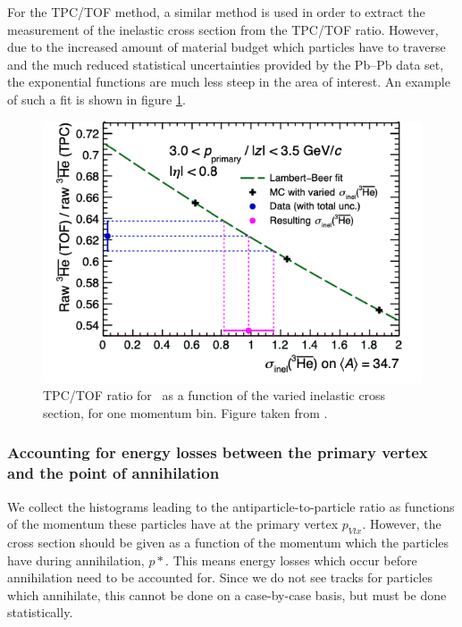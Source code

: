 For the TPC/TOF method, a similar method is used in order to extract the measurement of the inelastic cross section from the TPC/TOF ratio. However, due to the increased amount of material budget which particles have to traverse and the much reduced statistical uncertainties provided by the Pb--Pb data set, the exponential functions are much less steep in the area of interest. An example of such a fit is shown in figure \ref{fig:TPCTOF_fit}. 

\begin{figure}
    \centering
    \includegraphics[width=\textwidth]{figures/TOF-TPC_ratio_xs_extraction.png}
    \caption{TPC/TOF ratio for \ahe\ as a function of the varied inelastic cross section, for one momentum bin. Figure taken from \cite{antiHe3XS}.}
    \label{fig:TPCTOF_fit}
\end{figure}


\subsubsection{Accounting for energy losses between the primary vertex and the point of annihilation}\label{sec:Meth:ELoss}
We collect the histograms leading to the antiparticle-to-particle ratio as functions of the momentum these particles have at the primary vertex $p_{Vtx}$. However, the cross section should be given as a function of the momentum which the particles have during annihilation, $p*$. This means energy losses which occur before annihilation need to be accounted for. Since we do not see tracks for particles which annihilate, this cannot be done on a case-by-case basis, but must be done statistically.\\

